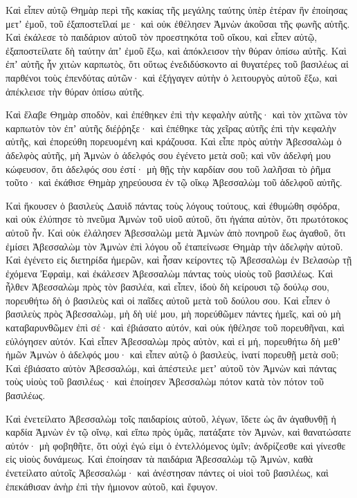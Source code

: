 {Καὶ εἶπεν αὐτῷ Θημὰρ περὶ τῆς κακίας τῆς μεγάλης ταύτης ὑπὲρ ἑτέραν ἣν ἐποίησας μετʼ ἐμοῦ, τοῦ ἐξαποστεῖλαί με· καὶ οὐκ ἐθέλησεν Ἀμνὼν ἀκοῦσαι τῆς φωνῆς αὐτῆς.
Καὶ ἐκάλεσε τὸ παιδάριον αὐτοῦ τὸν προεστηκότα τοῦ οἴκου, καὶ εἶπεν αὐτῷ, ἐξαποστείλατε δὴ ταύτην ἀπʼ ἐμοῦ ἔξω, καὶ ἀπόκλεισον τὴν θύραν ὀπίσω αὐτῆς.
Καὶ ἐπʼ αὐτῆς ἦν χιτὼν καρπωτὸς, ὅτι οὕτως ἐνεδιδύσκοντο αἱ θυγατέρες τοῦ βασιλέως αἱ παρθένοι τοὺς ἐπενδύτας αὐτῶν· καὶ ἐξήγαγεν αὐτὴν ὁ λειτουργὸς αὐτοῦ ἔξω, καὶ ἀπέκλεισε τὴν θύραν ὀπίσω αὐτῆς.
\par }{\PP {}Καὶ ἔλαβε Θημὰρ σποδὸν, καὶ ἐπέθηκεν ἐπὶ τὴν κεφαλὴν αὐτῆς· καὶ τὸν χιτῶνα τὸν καρπωτὸν τὸν ἐπʼ αὐτῆς διέῤῥηξε· καὶ ἐπέθηκε τὰς χεῖρας αὐτῆς ἐπὶ τὴν κεφαλὴν αὐτῆς, καὶ ἐπορεύθη πορευομένη καὶ κράζουσα.
Καὶ εἶπε πρὸς αὐτὴν Ἀβεσσαλὼμ ὁ ἀδελφὸς αὐτῆς, μὴ Ἀμνὼν ὁ ἀδελφός σου ἐγένετο μετὰ σοῦ; καὶ νῦν ἀδελφή μου κώφευσον, ὅτι ἀδελφός σου ἐστί· μὴ θῇς τὴν καρδίαν σου τοῦ λαλῆσαι τὸ ῥῆμα τοῦτο· καὶ ἐκάθισε Θημὰρ χηρεύουσα ἐν τῷ οἴκῳ Ἀβεσσαλὼμ τοῦ ἀδελφοῦ αὐτῆς.
\par }{\PP {}Καὶ ἤκουσεν ὁ βασιλεὺς Δαυὶδ πάντας τοὺς λόγους τούτους, καὶ ἐθυμώθη σφόδρα, καὶ οὐκ ἐλύπησε τὸ πνεῦμα Ἀμνὼν τοῦ υἱοῦ αὐτοῦ, ὅτι ἠγάπα αὐτὸν, ὅτι πρωτότοκος αὐτοῦ ἦν.
Καὶ οὐκ ἐλάλησεν Ἀβεσσαλὼμ μετὰ Ἀμνὼν ἀπὸ πονηροῦ ἕως ἀγαθοῦ, ὅτι ἐμίσει Ἀβεσσαλὼμ τὸν Ἀμνὼν ἐπὶ λόγου οὗ ἐταπείνωσε Θημὰρ τὴν ἀδελφὴν αὐτοῦ.
Καὶ ἐγένετο εἰς διετηρίδα ἡμερῶν, καὶ ἦσαν κείροντες τῷ Ἀβεσσαλὼμ ἐν Βελασὼρ τῇ ἐχόμενα Ἐφραὶμ, καὶ ἐκάλεσεν Ἀβεσσαλὼμ πάντας τοὺς υἱοὺς τοῦ βασιλέως.
Καὶ ἦλθεν Ἀβεσσαλὼμ πρὸς τὸν βασιλέα, καὶ εἶπεν, ἰδοὺ δὴ κείρουσι τῷ δούλῳ σου, πορευθήτω δὴ ὁ βασιλεὺς καὶ οἱ παῖδες αὐτοῦ μετὰ τοῦ δούλου σου.
Καὶ εἶπεν ὁ βασιλεὺς πρὸς Ἀβεσσαλὼμ, μὴ δὴ υἱέ μου, μὴ πορεύθῶμεν πάντες ἡμεῖς, καὶ οὐ μὴ καταβαρυνθῶμεν ἐπὶ σέ· καὶ ἐβιάσατο αὐτόν, καὶ οὐκ ἠθέλησε τοῦ πορευθῆναι, καὶ εὐλόγησεν αὐτόν.
Καὶ εἶπεν Ἀβεσσαλὼμ πρὸς αὐτὸν, καὶ εἰ μή, πορευθήτω δὴ μεθʼ ἡμῶν Ἀμνὼν ὁ ἀδελφός μου· καὶ εἶπεν αὐτῷ ὁ βασιλεὺς, ἱνατί πορευθῇ μετὰ σοῦ;
Καὶ ἐβιάσατο αὐτὸν Ἀβεσσαλώμ, καὶ ἀπέστειλε μετʼ αὐτοῦ τὸν Ἀμνὼν καὶ πάντας τοὺς υἱοὺς τοῦ βασιλέως· καὶ ἐποίησεν Ἀβεσσαλὼμ πότον κατὰ τὸν πότον τοῦ βασιλέως.
\par }{\PP {}Καὶ ἐνετείλατο Ἀβεσσαλὼμ τοῖς παιδαρίοις αὐτοῦ, λέγων, ἴδετε ὡς ἂν ἀγαθυνθῇ ἡ καρδία Ἀμνὼν ἐν τῷ οἴνῳ, καὶ εἴπω πρὸς ὑμᾶς, πατάξατε τὸν Ἀμνὼν, καὶ θανατώσατε αὐτόν· μὴ φοβηθῆτε, ὅτι οὐχὶ ἐγώ εἰμι ὁ ἐντελλόμενος ὑμῖν; ἀνδρίζεσθε καὶ γίνεσθε εἰς υἱοὺς δυνάμεως.
Καὶ ἐποίησαν τὰ παιδάρια Ἀβεσσαλὼμ τῷ Ἀμνὼν, καθὰ ἐνετείλατο αὐτοῖς Ἀβεσσαλώμ· καὶ ἀνέστησαν πάντες οἱ υἱοὶ τοῦ βασιλέως, καὶ ἐπεκάθισαν ἀνὴρ ἐπὶ τὴν ἡμιονον αὐτοῦ, καὶ ἔφυγον.
}
